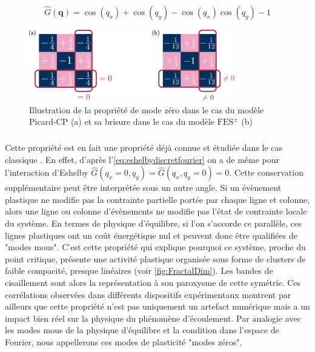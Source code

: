 \begin{equation}
	\hat{G}(\mathbf{q}) = \cos(q_x) + \cos(q_y) -\cos(q_x)\cos(q_y) -1
\end{equation}

\begin{figure}[h]
	\centering
	\includegraphics[width = 0.8\textwidth]{Chapitre4/Figures/CourtePortee/ZMCP.pdf}
	\caption{Illustration de la propriété de mode zéro dans le cas du modèle Picard-CP (a) et sa brisure dans le cas du modèle $\text{FES}^\pm$ (b)}
	\label{fig:Omodesshortrange}
\end{figure}

\subparagraph{}Cette propriété est en fait une propriété déjà connue et étudiée dans le cas classique \cite{tyukodi_depinning_2016, ferrero_elastic_2019}. En effet, d'après l'\autoref{eq:eshelbydiscretfourier} on a de même pour l'interaction d'Eshelby $\hat{G}(q_x=0,q_y)=\hat{G}(q_x,q_y=0)=0$. Cette conservation supplémentaire peut être interprétée sous un autre angle. Si un évènement plastique ne modifie pas la contrainte partielle portée par chaque ligne et colonne, alors une ligne ou colonne d'évènements ne modifie pas l'état de contrainte locale du système. En termes de physique d'équilibre, si l'on s'accorde ce parallèle, ces lignes plastiques ont un coût énergétique nul et peuvent donc être qualifiées de "modes mous". C'est cette propriété qui explique pourquoi ce système, proche du point critique, présente une activité plastique organisée sous forme de clusters de faible compacité, presque linéaires (voir \autoref{fig:FractalDim}). Les bandes de cisaillement \cite{martens_spontaneous_2012, rossi_finite-disorder_2022} sont alors la représentation à son paroxysme de cette symétrie. Ces corrélations observées dans différents dispositifs expérimentaux montrent par ailleurs que cette propriété n'est pas uniquement un artefact numérique mais a un impact bien réel sur la physique du phénomène d'écoulement. Par analogie avec les modes mous de la physique d'équilibre et la condition dans l'espace de Fourier, nous appellerons ces modes de plasticité "modes zéros". 

